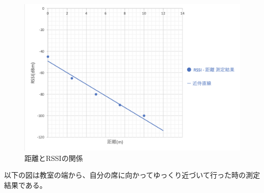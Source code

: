 \documentclass[dvipdfmx,autodetect-engine,titlepage]{jsarticle}
\begin{document}
\begin{figure}[h]
  \centering
  \includegraphics[scale=0.5]{pic3.png}
  \caption{距離とRSSIの関係}
\end{figure}

以下の図は教室の端から、自分の席に向かってゆっくり近づいて行った時の測定結果である。\\
\end{document}
